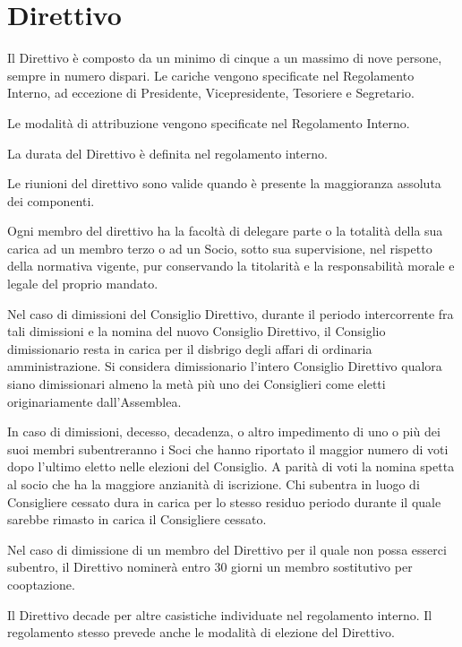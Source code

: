 \documentclass[legalpaper, 11pt]{exam}
\let\tempone\enumerate
\let\temptwo\endenumerate
\renewenvironment{enumerate}{\tempone\addtolength{\itemsep}{-0.45\baselineskip}}{\temptwo}
\begin{document}
\section{Direttivo}
\begin{enumerate}
	\item Il Direttivo è composto da un minimo di cinque a un massimo di nove persone, sempre in numero dispari. Le cariche vengono specificate nel Regolamento Interno, ad eccezione di Presidente, Vicepresidente, Tesoriere e Segretario.
	\item Le modalità di attribuzione vengono specificate nel Regolamento Interno.
	\item La durata del Direttivo è definita nel regolamento interno.
	\item Le riunioni del direttivo sono valide quando è presente la maggioranza assoluta dei componenti.
	\item Ogni membro del direttivo ha la facoltà di delegare parte o la totalità della sua carica ad un membro terzo o ad un Socio, sotto sua supervisione, nel rispetto della normativa vigente, pur conservando la titolarità e la responsabilità morale e legale del proprio mandato.
	\item Nel caso di dimissioni del Consiglio Direttivo, durante il periodo intercorrente fra tali dimissioni e la nomina del nuovo Consiglio Direttivo, il Consiglio dimissionario resta in carica per il disbrigo degli affari di ordinaria amministrazione. Si considera dimissionario l’intero Consiglio Direttivo qualora siano dimissionari almeno la metà più uno dei Consiglieri come eletti originariamente dall’Assemblea.
	\item In caso di dimissioni, decesso, decadenza, o altro impedimento di uno o più dei suoi membri subentreranno i Soci che hanno riportato il maggior numero di voti dopo l’ultimo eletto nelle elezioni del Consiglio. A parità di voti la nomina spetta al socio che ha la maggiore anzianità di iscrizione. Chi subentra in luogo di Consigliere cessato dura in carica per lo stesso residuo periodo durante il quale sarebbe rimasto in carica il Consigliere cessato.
	\item Nel caso di dimissione di un membro del Direttivo per il quale non possa esserci subentro, il Direttivo nominerà entro 30 giorni un membro sostitutivo per cooptazione.
	\item Il Direttivo decade per altre casistiche individuate nel regolamento interno. Il regolamento stesso  prevede anche le modalità di elezione del Direttivo.
\end{enumerate}
\end{document}
